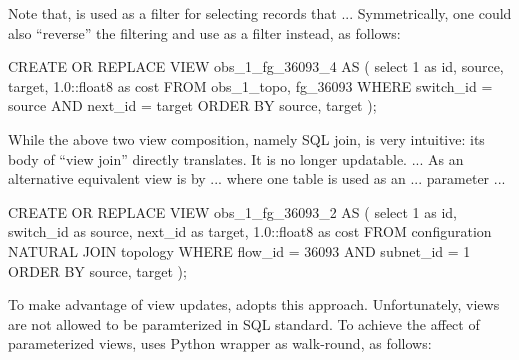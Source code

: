 Note that,  is used as a filter for selecting
 records that ... Symmetrically, one could also
``reverse'' the filtering and use  as a filter instead,
as follows:
\begin{sql}
CREATE OR REPLACE VIEW obs_1_fg_36093_4 AS (
       select 1 as id, source, target, 
	      1.0::float8 as cost
       FROM obs_1_topo, fg_36093
       WHERE switch_id = source AND next_id = target
       ORDER BY source, target
);
\end{sql}


While the above two view composition, namely SQL join, is very
intuitive: its body of ``view join'' directly translates. It is no
longer updatable. ... As an alternative equivalent view is by
... where one table is used as an ... parameter ...
\begin{sql}
CREATE OR REPLACE VIEW obs_1_fg_36093_2 AS (
       select 1 as id,
       	      switch_id as source,
	      next_id as target,
	      1.0::float8 as cost
       FROM configuration NATURAL JOIN topology
       WHERE flow_id = 36093 AND subnet_id = 1
       ORDER BY source, target
);
\end{sql}

To make advantage of view updates, \Sys adopts this
approach. Unfortunately, views are not allowed to be paramterized in
SQL standard. To achieve the affect of parameterized views, \Sys uses
Python wrapper as walk-round, as follows:

